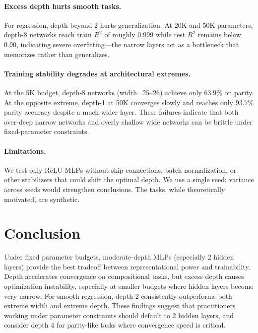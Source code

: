 \documentclass[11pt,a4paper]{article}
\begin{document}
\paragraph{Excess depth hurts smooth tasks.} For regression, depth beyond 2 hurts generalization. At 20K and 50K parameters, depth-8 networks reach train $R^2$ of roughly 0.999 while test $R^2$ remains below 0.90, indicating severe overfitting---the narrow layers act as a bottleneck that memorizes rather than generalizes.

\paragraph{Training stability degrades at architectural extremes.} At the 5K budget, depth-8 networks (width=25--26) achieve only 63.9\% on parity. At the opposite extreme, depth-1 at 50K converges slowly and reaches only 93.7\% parity accuracy despite a much wider layer. These failures indicate that both over-deep narrow networks and overly shallow wide networks can be brittle under fixed-parameter constraints.

\paragraph{Limitations.} We test only ReLU MLPs without skip connections, batch normalization, or other stabilizers that could shift the optimal depth. We use a single seed; variance across seeds would strengthen conclusions. The tasks, while theoretically motivated, are synthetic.

\section{Conclusion}

Under fixed parameter budgets, moderate-depth MLPs (especially 2 hidden layers) provide the best tradeoff between representational power and trainability. Depth accelerates convergence on compositional tasks, but excess depth causes optimization instability, especially at smaller budgets where hidden layers become very narrow. For smooth regression, depth-2 consistently outperforms both extreme width and extreme depth. These findings suggest that practitioners working under parameter constraints should default to 2 hidden layers, and consider depth 4 for parity-like tasks where convergence speed is critical.
\end{document}
